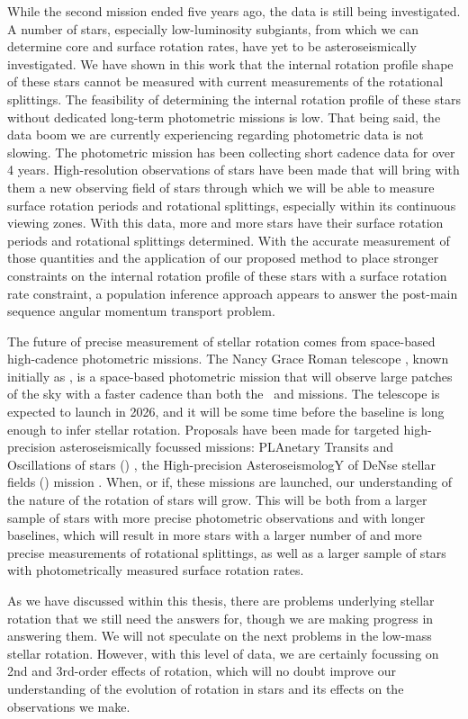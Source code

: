 While the second \kepler{} mission ended five years ago, the data is still being investigated.
A number of stars, especially low-luminosity subgiants, from which we can determine core and surface rotation rates, have yet to be asteroseismically investigated.
We have shown in this work that the internal rotation profile shape of these stars cannot be measured with current measurements of the rotational splittings.
The feasibility of determining the internal rotation profile of these stars without dedicated long-term photometric missions is low.
That being said, the data boom we are currently experiencing regarding photometric data is not slowing.
The \tess{} photometric mission has been collecting short cadence data for over 4 years.
High-resolution observations of stars have been made that will bring with them a new observing field of stars through which we will be able to measure surface rotation periods and rotational splittings, especially within its continuous viewing zones.
With this data, more and more stars have their surface rotation periods \citep{claytor_tess_2023} and rotational splittings determined.
With the accurate measurement of those quantities and the application of our proposed method to place stronger constraints on the internal rotation profile of these stars with a surface rotation rate constraint, a population inference approach appears to answer the post-main sequence angular momentum transport problem.

The future of precise measurement of stellar rotation comes from space-based high-cadence photometric missions.
The Nancy Grace Roman telescope \citep{akeson_wide_2019}, known initially as \wfirst, is a space-based photometric mission that will observe large patches of the sky with a faster cadence than both the \kepler\ and \tess{} missions.
The telescope is expected to launch in 2026, and it will be some time before the baseline is long enough to infer stellar rotation.
Proposals have been made for targeted high-precision asteroseismically focussed missions: PLAnetary Transits and Oscillations of stars (\plato) \citep{rauer_plato_2014}, the High-precision AsteroseismologY of DeNse stellar fields (\haydn) mission \citep{miglio_haydn_2021}.
When, or if, these missions are launched, our understanding of the nature of the rotation of stars will grow.
This will be both from a larger sample of stars with more precise photometric observations and with longer baselines, which will result in more stars with a larger number of and more precise measurements of rotational splittings, as well as a larger sample of stars with photometrically measured surface rotation rates.

As we have discussed within this thesis, there are problems underlying stellar rotation that we still need the answers for, though we are making progress in answering them.
We will not speculate on the next problems in the low-mass stellar rotation. However, with this level of data, we are certainly focussing on 2nd and 3rd-order effects of rotation, which will no doubt improve our understanding of the evolution of rotation in stars and its effects on the observations we make.